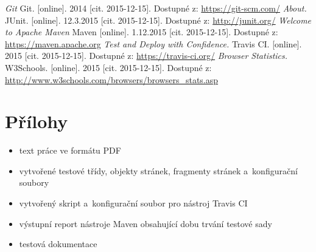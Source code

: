 \documentclass[
    color,   %
	table,   %
    twoside, %
    nolot, nolof,
]{fithesis3}
\begin{document}
\begin{thebibliography}{9}
\emph{Git} Git. [online]. 2014 [cit. 2015-12-15]. Dostupné z: \url{https://git-scm.com/}
\emph{About.} JUnit. [online]. 12.3.2015 [cit. 2015-12-15]. Dostupné z: \url{http://junit.org/}
\emph{Welcome to Apache Maven} Maven [online]. 1.12.2015 [cit. 2015-12-15]. Dostupné z: \url{https://maven.apache.org}
\emph{Test and Deploy with Confidence.} Travis CI. [online]. 2015 [cit. 2015-12-15]. Dostupné z: \url{https://travis-ci.org/}
\emph{Browser Statistics.} W3Schools. [online]. 2015 [cit. 2015-12-15]. Dostupné z: \url{http://www.w3schools.com/browsers/browsers_stats.asp}
\end{thebibliography}
\chapter*{Přílohy}
\begin{itemize}
\item text práce ve formátu PDF
\item vytvořené testové třídy, objekty stránek, fragmenty stránek a~konfigurační soubory
\item vytvořený skript a~konfigurační soubor pro nástroj Travis CI
\item výstupní report nástroje Maven obsahující dobu trvání testové sady
\item testová dokumentace
\end{itemize}
\end{document}
